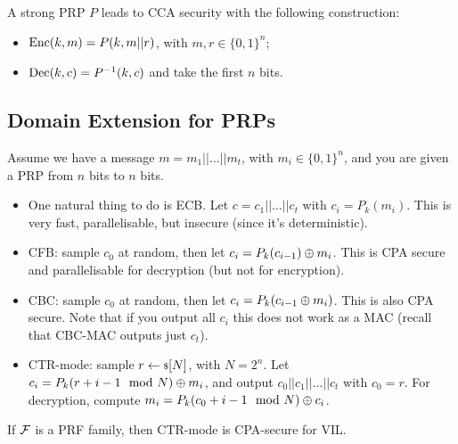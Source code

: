 A strong \ac{PRP} $P$ leads to \ac{CCA} security with the following construction:
\begin{itemize}
	\item $\mathrm{Enc}(k,m) = P(k, m || r)$, with $m,r \in \{0,1\}^{n}$; 
	\item $\mathrm{Dec}(k, c) = P^{-1}(k,c)$ and take the first $n$ bits.
\end{itemize}

\subsection{Domain Extension for \aclp{PRP}}

Assume we have a message $m = m_1 || \dots || m_t$, with $m_i \in \{0,1\}^{n}$, and you are given a \ac{PRP} from $n$ bits to $n$ bits.
\begin{itemize}
	\item One natural thing to do is \ac{ECB}.
		Let $c = c_1 || \dots || c_t$ with $c_i = P_k(m_i)$.
		This is very fast, parallelisable, but insecure (since it's deterministic).
	\item \ac{CFB}: sample $c_0$ at random, then let $c_i = P_k(c_{i-1}) \oplus m_i$.
		This is \ac{CPA} secure and parallelisable for decryption (but not for encryption).
	\item \ac{CBC}: sample $c_0$ at random, then let $c_i = P_k(c_{i-1} \oplus m_i)$.
		This is also \ac{CPA} secure.
		Note that if you output all $c_i$ this does not work as a \ac{MAC} (recall that \ac{CBC}-\ac{MAC} outputs just $c_t$).
	\item \ac{CTR}-mode: sample $r \leftarrow {\scriptstyle \$} {[N]}$, with $N = 2^{n}$.
		Let $c_i = P_k(r + i - 1 \mod N) \oplus m_i$, and output $c_0 || c_1 || \dots || c_t$ with $c_0 = r$.
		For decryption, compute $m_i = P_k(c_0 + i - 1 \mod N) \oplus c_i$.
\end{itemize}

\begin{theorem} \label{thm:ctr-mode-cpa-secure-vil}
	If $\mathcal{F}$ is a \ac{PRF} family, then \ac{CTR}-mode is \ac{CPA}-secure for \ac{VIL}.
\end{theorem}

